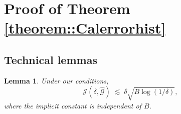 \documentclass{article}
\theoremstyle{plain}
\newtheorem{lemma}{Lemma}
\theoremstyle{definition}
\theoremstyle{remark}
\begin{document}
 

\section{Proof of Theorem \ref{theorem::Calerrorhist}}
 
 

\subsection{Technical lemmas}

 



\begin{lemma}
\label{lemma::entropynumbers}
Under our conditions,
\[
\mathcal{J}\left(\delta, \widehat{\mathcal{G}}\right)
\;\lesssim\;
\delta \sqrt{B \log(1/\delta)},
\]
where the implicit constant is independent of \(B\).
\end{lemma}
\end{document}
